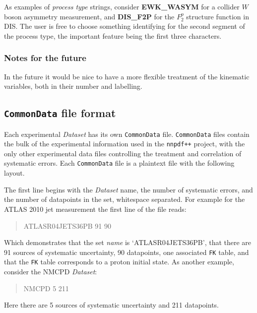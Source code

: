 \documentclass[11pt]{article}
\begin{document}
As examples of \emph{process type} strings, consider \textbf{EWK\_WASYM} for a collider $W$ boson asymmetry measurement, and \textbf{DIS\_F2P} for the $F_2^p$ structure function in DIS. The user is free to choose something identifying for the second  segment of the process type, the important feature being the first three characters.

\subsubsection*{Notes for the future}
In the future it would be nice to have a more flexible treatment of the kinematic variables, both in their number and labelling.


\subsection{{\tt CommonData} file format}
Each experimental \emph{Dataset} has its own {\tt CommonData} file. {\tt CommonData} files contain the bulk of the experimental information used in the {\tt nnpdf++} project, with the only other experimental data files controlling the treatment and correlation of systematic errors. Each {\tt CommonData} file is a plaintext file with the following layout.

The first line begins with the \emph{Dataset} name, the number of systematic errors, and the number of datapoints in the set, whitespace separated.
For example for the ATLAS 2010 jet measurement the first line of the file reads:
\begin{quotation}\noindent
ATLASR04JETS36PB        91      90
\end{quotation}
Which demonstrates that the set \emph{name} is `ATLASR04JETS36PB', that there are 91 sources of systematic uncertainty, 90 datapoints, one associated {\tt FK} table, and that the {\tt FK} table corresponds to a proton initial state. As another example, consider the NMCPD \emph{Dataset}:
\begin{quotation}\noindent
NMCPD   5       211
\end{quotation}
Here there are 5 sources of systematic uncertainty and 211 datapoints.
\end{document}
